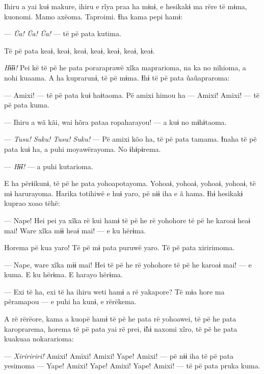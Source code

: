 Ihiru a yai kuɨ makure, ihiru e rĩya praa ha mɨnɨ, e hesikakɨ ma rëre të
mɨma, kuonomi. Mamo axëoma. Taproimi. Ɨha kama pepi hamɨ: 

--- \textit{Ũa! Ũa! Ũa!} --- të pë pata kutima. 

Të pë pata keaɨ, keaɨ, keaɨ, keaɨ, keaɨ, keaɨ, keaɨ. 

\textit{Hɨ̃ɨɨ! }Pei kë të pë he pata poraraprawë xĩka maprarioma, na ka no
nihioma, a nohi kuaama. A ha kuprarunɨ, të pë mɨma. Ɨhɨ të pë pata
ũaũapraroma: 

--- Amixi! --- të pë pata kuɨ haɨtaoma. Pë amixi himou ha --- Amixi!
Amixi! --- të pë pata kuma.

--- Ihiru a wã kãi, wai hõra pataa ropaharayou! --- a kuɨ no mɨhɨtaoma.

--- \textit{Tusu! Suku! Tusu! Suku!} --- Pë amixi kõo ha, të pë pata tamama.
Ɨnaha të pë pata kuɨ ha, a puhi moyawërayoma. No ɨhɨpɨrema. 

--- \textit{Hɨ̃ɨ! }--- a puhi kutarioma. 


E ha përɨikunɨ, të pë he pata yohoapotayoma. Yohoaɨ, yohoaɨ, yohoaɨ,
yohoaɨ, të mɨ harurayoma. Harika totihiwë e huɨ yaro, pë nɨɨ iha e ã
hama. Ɨhɨ hesikakɨ kuprao xoao tëhë:

--- Nape! Hei pei ya xĩka rë kui hamɨ të pë he rë yohohore të pë he
karoaɨ heaɨ mai! Ware xĩka mɨɨ heaɨ mai! --- e ku hërɨma. 

Horema pë kua yaro! Të pë mɨ pata puruwë yaro. Të pë pata xiririmoma. 

--- Nape, ware xĩka mɨɨ mai! Hei të pë he rë yohohore të pë he karoaɨ
mai! --- e kuma. E ku hërɨma. E harayo hërɨma. 


--- Exi të ha, exi të ha ihiru weti hamɨ a rë yakapore? Të mɨa hore ma
përamapou --- e puhi ha kunɨ, e rërëkema. 

A rë rërëore, kama a kuopë hamɨ të pë he pata rë yohoawei, të pë he pata
karoprarema, horema të pë pata yai rë prei, ɨ̃hɨ naxomi xĩro, të pë he
pata kuakuaa nokararioma:

--- \textit{Xiriririri!} Amixi! Amixi! Amixi! Yape! Amixi! --- pë nɨɨ iha të pë
pata yesimoma --- Yape! Amixi! Yape! Amixi! Yape! Amixi! --- të pë pata
pruka kuma. 

